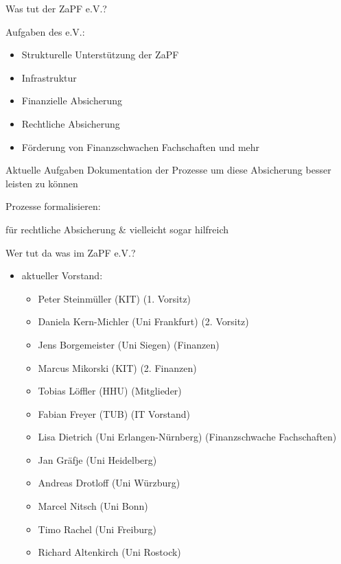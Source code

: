 \documentclass[compress, aspectratio=169]{beamer}
\begin{document}
\pagestyle{empty}
\begin{frame}{Was tut der ZaPF e.V.?}
\begin{block}{Aufgaben des e.V.:}
\begin{itemize}
\item Strukturelle Unterstützung der ZaPF
\item Infrastruktur
\item Finanzielle Absicherung
\item Rechtliche Absicherung
\item Förderung von Finanzschwachen Fachschaften und mehr
\end{itemize}
\end{block}
\pause
\begin{block}{Aktuelle Aufgaben}
Dokumentation der Prozesse um diese Absicherung besser leisten zu können
\end{block}
\end{frame}

\thispagestyle{empty}
\begin{frame}{Prozesse formalisieren:}
  \begin{center}
  \end{center}
    für rechtliche Absicherung \& vielleicht sogar hilfreich
\end{frame}


\thispagestyle{empty}
\begin{frame}{Wer tut da was im ZaPF e.V.?}
    \begin{itemize}
        \item[] aktueller Vorstand:
        \begin{itemize}
             \item Peter Steinmüller (KIT) (1. Vorsitz)
             \item Daniela Kern-Michler (Uni Frankfurt) (2. Vorsitz)
             \item Jens Borgemeister (Uni Siegen) (Finanzen)
             \item Marcus Mikorski (KIT) (2. Finanzen)
             \item Tobias Löffler (HHU) (Mitglieder)
             \item Fabian Freyer (TUB) (IT Vorstand)
             \item Lisa Dietrich (Uni Erlangen-Nürnberg)  (Finanzschwache Fachschaften)
             \item Jan Gräfje (Uni Heidelberg)
             \item Andreas Drotloff (Uni Würzburg)
             \item Marcel Nitsch (Uni Bonn)
             \item Timo Rachel (Uni Freiburg)
             \item Richard Altenkirch (Uni Rostock)
        \end{itemize}
    \end{itemize}
\end{frame}
\end{document}
